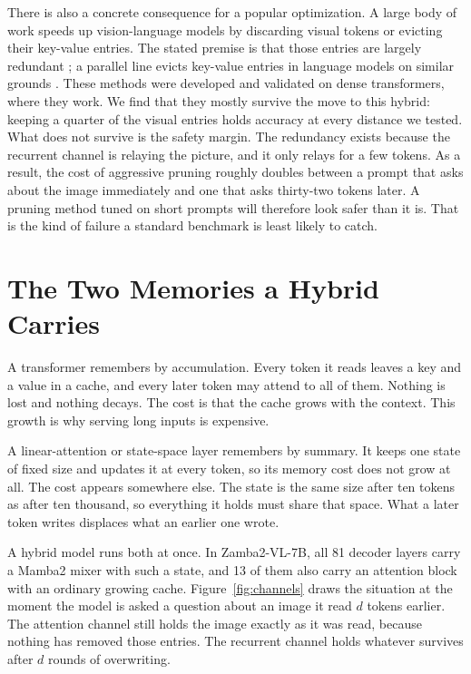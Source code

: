 \documentclass{article}
\begin{document}
There is also a concrete consequence for a popular optimization. A large body
of work speeds up vision-language models by discarding visual tokens or
evicting their key-value entries. The stated premise is that those entries are
largely redundant \cite{chen2024fastv,yang2024visionzip,shang2025prumerge}; a
parallel line evicts key-value entries in language models on similar grounds
\cite{zhang2023h2o,li2024snapkv,xiao2024streaming}. These methods were
developed and validated on dense transformers, where they work. We find that
they mostly survive the move to this hybrid: keeping a quarter of the visual
entries holds accuracy at every distance we tested. What does not survive is
the safety margin. The redundancy exists because the recurrent channel is
relaying the picture, and it only relays for a few tokens. As a result, the
cost of aggressive pruning roughly doubles between a prompt that asks about
the image immediately and one that asks thirty-two tokens later. A pruning
method tuned on short prompts will therefore look safer than it is. That is
the kind of failure a standard benchmark is least likely to catch.

\section{The Two Memories a Hybrid Carries}

A transformer remembers by accumulation. Every token it reads leaves a key and
a value in a cache, and every later token may attend to all of them. Nothing
is lost and nothing decays. The cost is that the cache grows with the context.
This growth is why serving long inputs is expensive.

A linear-attention or state-space layer remembers by summary. It keeps one
state of fixed size and updates it at every token, so its memory cost does not
grow at all. The cost appears somewhere else. The state is the same size after
ten tokens as after ten thousand, so everything it holds must share that
space. What a later token writes displaces what an earlier one wrote.

A hybrid model runs both at once. In Zamba2-VL-7B, all 81 decoder layers carry
a Mamba2 mixer with such a state, and 13 of them also carry an attention block
with an ordinary growing cache. Figure~\ref{fig:channels} draws the situation
at the moment the model is asked a question about an image it read $d$ tokens
earlier. The attention channel still holds the image exactly as it was read,
because nothing has removed those entries. The recurrent channel holds
whatever survives after $d$ rounds of overwriting.
\end{document}
